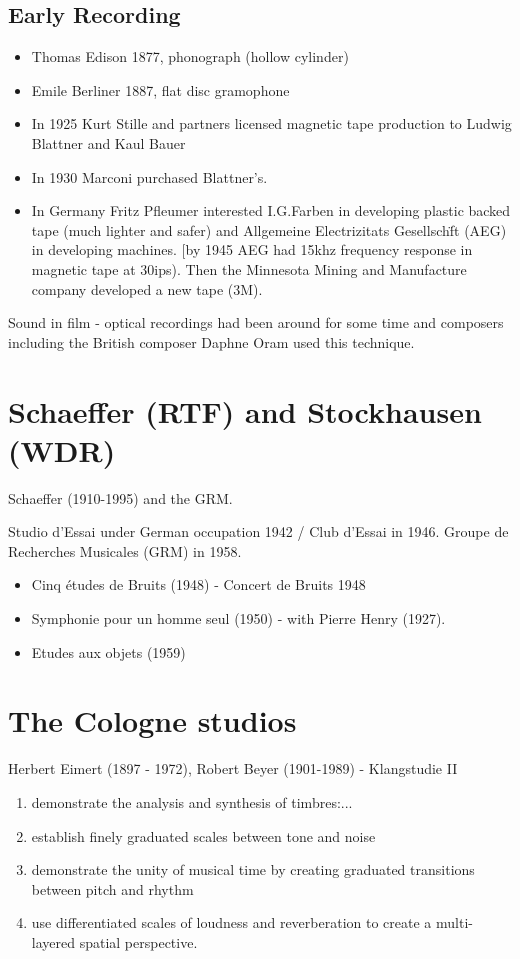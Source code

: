 \subsection{Early Recording}
\begin{itemize}
\item Thomas Edison 1877, phonograph (hollow cylinder)
\item Emile Berliner 1887, flat disc gramophone
\item In 1925 Kurt Stille and partners licensed magnetic tape production to Ludwig Blattner and Kaul Bauer
\item In 1930 Marconi purchased Blattner's.
\item In Germany Fritz Pfleumer interested I.G.Farben in developing plastic backed tape (much lighter and safer) and Allgemeine Electrizitats Gesellsch\"ft (AEG) in developing machines. [by 1945 AEG had 15khz frequency response in magnetic tape at 30ips). Then the Minnesota Mining and Manufacture company developed a new tape (3M).
\end{itemize}

Sound in film - optical recordings had been around for some time and composers including the British composer Daphne Oram used this technique.

\section{Schaeffer (RTF) and Stockhausen (WDR)}

Schaeffer (1910-1995) and the GRM.

Studio d'Essai under German occupation 1942 / Club d'Essai in 1946. Groupe de Recherches Musicales (GRM) in 1958.

\begin{itemize}
\item Cinq \'etudes de Bruits (1948) - Concert de Bruits 1948
\item Symphonie pour un homme seul (1950) - with Pierre Henry (1927).
\item Etudes aux objets (1959)
\end{itemize}

\section{The Cologne studios}

Herbert Eimert (1897 - 1972), Robert Beyer (1901-1989) - Klangstudie II

\begin{enumerate}
\item demonstrate the analysis and synthesis of timbres:...
\item establish finely graduated scales between tone and noise
\item demonstrate the unity of musical time by creating graduated transitions between pitch and rhythm
\item use differentiated scales of loudness and reverberation to create a multi-layered spatial perspective.
\end{enumerate}

